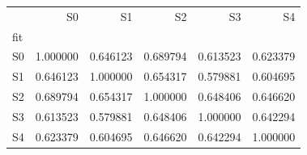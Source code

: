 \begin{tabular}{lrrrrr}
\toprule
 & S0 & S1 & S2 & S3 & S4 \\
fit &  &  &  &  &  \\
\midrule
S0 & 1.000000 & 0.646123 & 0.689794 & 0.613523 & 0.623379 \\
S1 & 0.646123 & 1.000000 & 0.654317 & 0.579881 & 0.604695 \\
S2 & 0.689794 & 0.654317 & 1.000000 & 0.648406 & 0.646620 \\
S3 & 0.613523 & 0.579881 & 0.648406 & 1.000000 & 0.642294 \\
S4 & 0.623379 & 0.604695 & 0.646620 & 0.642294 & 1.000000 \\
\bottomrule
\end{tabular}
